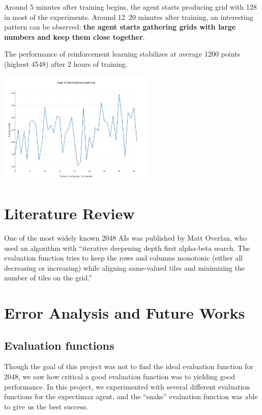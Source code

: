 \documentclass[9pt,twocolumn]{article}
\begin{document}
Around 5 minutes after training begins, the agent starts producing grid with 128 in most of the experiments. Around 12~20 minutes after training, an interesting pattern can be observed: \textbf{the agent starts gathering grids with large numbers and keep them close together}.

The performance of reinforcement learning stabilizes at average 1200 points (highest 4548) after 2 hours of training.

\begin{centering}

\includegraphics[width=75mm]{rl_graph.jpg}

\end{centering}

\section{Literature Review}

One of the most widely known 2048 AIs was published by Matt Overlan, who used an algorithm with “iterative deepening depth first alpha-beta search. The evaluation function tries to keep the rows and columns monotonic (either all decreasing or increasing) while aligning same-valued tiles and minimizing the number of tiles on the grid.”

\section{Error Analysis and Future Works}

\subsection{Evaluation functions}

Though the goal of this project was not to find the ideal evaluation function for 2048, we saw how critical a good evaluation function was to yielding good performance. In this project, we experimented with several different evaluation functions for the expectimax agent, and the “snake” evaluation function was able to give us the best success. 
\end{document}
